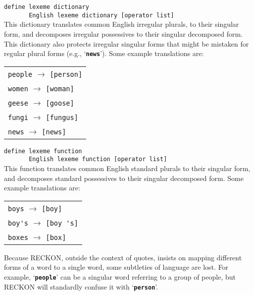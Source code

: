 \documentclass[12pt]{article}
\newcommand{\TT}[1]{{\tt \bfseries #1}}
\begin{document}
\begin{list}{}{}

\item
\verb|define lexeme dictionary| \\
\verb|       English lexeme dictionary [operator list]|\\[1ex]
This dictionary translates common English irregular plurals,
to their singular form, and decomposes
irregular possessives to their singular decomposed form.
This dictionary also protects irregular singular forms that might be
mistaken for regular plural forms (e.g., `\TT{news}').
Some example translations are:

\begin{center}
\begin{tabular}{l}
\verb|people| $\longrightarrow$ \verb|[person]| \\
\verb|women| $\longrightarrow$ \verb|[woman]| \\
\verb|geese| $\longrightarrow$ \verb|[goose]| \\
\verb|fungi| $\longrightarrow$ \verb|[fungus]| \\
\verb|news| $\longrightarrow$ \verb|[news]| \\
\end{tabular}
\end{center}

\item
\verb|define lexeme function| \\
\verb|       English lexeme function [operator list]|\\[1ex]
This function translates common English standard plurals
to their singular form, and decomposes
standard possessives to their singular decomposed form.
Some example translations are:

\begin{center}
\begin{tabular}{l}
\verb|boys| $\longrightarrow$ \verb|[boy]| \\
\verb|boy's| $\longrightarrow$ \verb|[boy 's]| \\
\verb|boxes| $\longrightarrow$ \verb|[box]| \\
\end{tabular}
\end{center}

\end{list}

Because RECKON, outside the context of quotes,
insists on mapping different forms of a word to a single
word, some subtleties of language are lost.  For example, `\TT{people}'
can be a singular word referring to a group of people, but RECKON will
standardly confuse it with `\TT{person}'.
\end{document}
